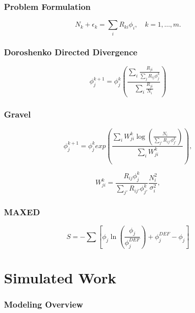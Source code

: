 \documentclass[fleqn]{beamer}
\begin{document}
\begin{frame}
\frametitle{Problem Formulation}
\begin{equation}
\label{eqn:disc-response}
N_k + \epsilon_k = \sum_i R_{ki} \phi_i, \quad k = 1,\ldots, m .
\end{equation}
\end{frame}


\begin{frame}
\frametitle{Doroshenko Directed Divergence}

\begin{equation}
\label{eqn:doroshenko}
\phi_j^{k + 1} = \phi_j^{k} (\frac{\sum_i \frac{R_{ji}}{\sum_j R_{ij} \phi_j^k}}{\sum_i \frac{R_{ji}}{N_i}}) 
\end{equation}

\end{frame}

\begin{frame}
\frametitle{Gravel}

\begin{equation}
\label{eqn:sandii}
\phi_j^{k + 1} = \phi_j^{k} exp(\frac{\sum_i W_{ji}^k \log(\frac{N_i}{\sum_{j'} R_{ij'} \phi_{j'}^k})}{\sum_i W_{ji}^k}) ,
\end{equation}

\begin{equation}
\label{eqn:gravel-w}
W_{ji}^k = \frac{R_{ij} \phi_{j}^k}{\sum_{j'} R_{ij'} \phi_{j'}^k} \frac{N_i^2}{\sigma_i^2} ,
\end{equation}
\end{frame}

\begin{frame}
\frametitle{MAXED}
\begin{equation}
\label{eqn:maxed-skilling}
S = - \sum [\phi_j \ln (\frac{\phi_j}{\phi_j^{DEF}}) + \phi_j^{DEF} - \phi_j]
\end{equation}
\end{frame}


\section{Simulated Work}
\begin{frame}
\frametitle{Modeling Overview}

\end{frame}
\end{document}
